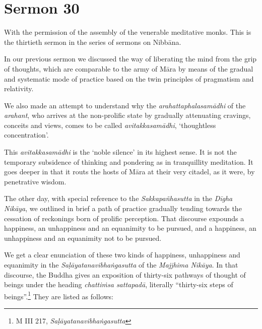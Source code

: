 \chapter{Sermon 30}

\NibbanaOpeningQuote

With the permission of the assembly of the venerable meditative monks. This is the thirtieth sermon in the series of sermons on Nibbāna.

In our previous sermon we discussed the way of liberating the mind from the grip of thoughts, which are comparable to the army of Māra by means of the gradual and systematic mode of practice based on the twin principles of pragmatism and relativity.

We also made an attempt to understand why the \emph{arahattaphalasamādhi} of the \emph{arahant}, who arrives at the non-prolific state by gradually attenuating cravings, conceits and views, comes to be called \emph{avitakkasamādhi}, `thoughtless concentration'.

This \emph{avitakkasamādhi} is the `noble silence' in its highest sense. It is not the temporary subsidence of thinking and pondering as in tranquillity meditation. It goes deeper in that it routs the hosts of Māra at their very citadel, as it were, by penetrative wisdom.

The other day, with special reference to the \emph{Sakkapañhasutta} in the \emph{Dīgha Nikāya}, we outlined in brief a path of practice gradually tending towards the cessation of reckonings born of prolific perception. That discourse expounds a happiness, an unhappiness and an equanimity to be pursued, and a happiness, an unhappiness and an equanimity not to be pursued.

We get a clear enunciation of these two kinds of happiness, unhappiness and equanimity in the \emph{Saḷāyatanavibhaṅgasutta} of the \emph{Majjhima Nikāya}. In that discourse, the Buddha gives an exposition of thirty-six pathways of thought of beings under the heading \emph{chattiṁsa sattapadā}, literally ``thirty-six steps of beings''.\footnote{M III 217, \emph{Saḷāyatanavibhaṅgasutta}} They are listed as follows:

